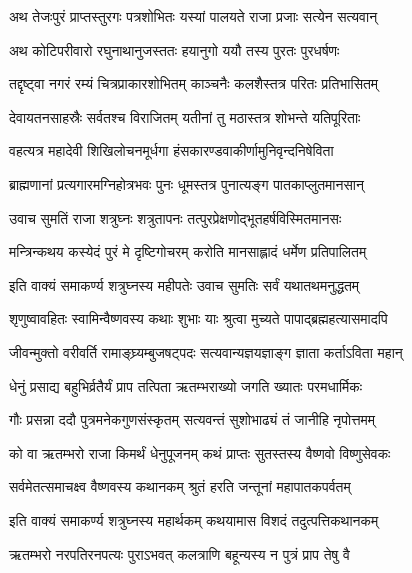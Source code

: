 \twolineshloka
{अथ तेजःपुरं प्राप्तस्तुरगः पत्रशोभितः}
{यस्यां पालयते राजा प्रजाः सत्येन सत्यवान्}%

\twolineshloka
{अथ कोटिपरीवारो रघुनाथानुजस्ततः}
{हयानुगो ययौ तस्य पुरतः पुरधर्षणः}%

\twolineshloka
{तद्दृष्ट्वा नगरं रम्यं चित्रप्राकारशोभितम्}
{काञ्चनैः कलशैस्तत्र परितः प्रतिभासितम्}%

\twolineshloka
{देवायतनसाहस्रैः सर्वतश्च विराजितम्}
{यतीनां तु मठास्तत्र शोभन्ते यतिपूरिताः}%

\twolineshloka
{वहत्यत्र महादेवी शिखिलोचनमूर्धगा}
{हंसकारण्डवाकीर्णामुनिवृन्दनिषेविता}%

\twolineshloka
{ब्राह्मणानां प्रत्यगारमग्निहोत्रभवः पुनः}
{धूमस्तत्र पुनात्यङ्ग पातकाप्लुतमानसान्}%

\twolineshloka
{उवाच सुमतिं राजा शत्रुघ्नः शत्रुतापनः}
{तत्पुरप्रेक्षणोद्भूतहर्षविस्मितमानसः}%


\twolineshloka
{मन्त्रिन्कथय कस्येदं पुरं मे दृष्टिगोचरम्}
{करोति मानसाह्लादं धर्मेण प्रतिपालितम्}%


\twolineshloka
{इति वाक्यं समाकर्ण्य शत्रुघ्नस्य महीपतेः}
{उवाच सुमतिः सर्वं यथातथमनुद्धतम्}%


\twolineshloka
{शृणुष्वावहितः स्वामिन्वैष्णवस्य कथाः शुभाः}
{याः श्रुत्वा मुच्यते पापाद्ब्रह्महत्यासमादपि}%

\twolineshloka
{जीवन्मुक्तो वरीवर्ति रामाङ्घ्र्यम्बुजषट्पदः}
{सत्यवान्यज्ञयज्ञाङ्ग ज्ञाता कर्ताऽविता महान्}%

\twolineshloka
{धेनुं प्रसाद्य बहुभिर्व्रतैर्यं प्राप तत्पिता}
{ऋतम्भराख्यो जगति ख्यातः परमधार्मिकः}%

\twolineshloka
{गौः प्रसन्ना ददौ पुत्रमनेकगुणसंस्कृतम्}
{सत्यवन्तं सुशोभाढ्यं तं जानीहि नृपोत्तमम्}%


\twolineshloka
{को वा ऋतम्भरो राजा किमर्थं धेनुपूजनम्}
{कथं प्राप्तः सुतस्तस्य वैष्णवो विष्णुसेवकः}%

\twolineshloka
{सर्वमेतत्समाचक्ष्व वैष्णवस्य कथानकम्}
{श्रुतं हरति जन्तूनां महापातकपर्वतम्}%


\twolineshloka
{इति वाक्यं समाकर्ण्य शत्रुघ्नस्य महार्थकम्}
{कथयामास विशदं तदुत्पत्तिकथानकम्}%

\twolineshloka
{ऋतम्भरो नरपतिरनपत्यः पुराऽभवत्}
{कलत्राणि बहून्यस्य न पुत्रं प्राप तेषु वै}%

